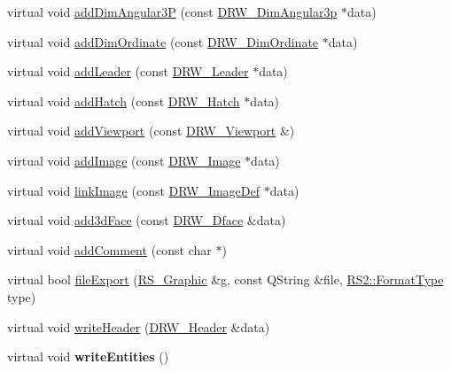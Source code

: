 \begin{DoxyCompactItemize}
virtual void \hyperlink{classRS__FilterDXFRW_af0227a89edea79079d998e4cd2887fea}{add\-Dim\-Angular3\-P} (const \hyperlink{classDRW__DimAngular3p}{D\-R\-W\-\_\-\-Dim\-Angular3p} $\ast$data)
\item 
virtual void \hyperlink{classRS__FilterDXFRW_a8db3ffff95edbce4dd2849937ed5e7ab}{add\-Dim\-Ordinate} (const \hyperlink{classDRW__DimOrdinate}{D\-R\-W\-\_\-\-Dim\-Ordinate} $\ast$data)
\item 
virtual void \hyperlink{classRS__FilterDXFRW_a0cecf17b58ada0ee9f8e30ef412c4cdd}{add\-Leader} (const \hyperlink{classDRW__Leader}{D\-R\-W\-\_\-\-Leader} $\ast$data)
\item 
virtual void \hyperlink{classRS__FilterDXFRW_ad36b05f6c1562ffaaf8a0071c7173364}{add\-Hatch} (const \hyperlink{classDRW__Hatch}{D\-R\-W\-\_\-\-Hatch} $\ast$data)
\item 
virtual void \hyperlink{classRS__FilterDXFRW_a3d98a3d45715307a82dd3f63c38d0f6d}{add\-Viewport} (const \hyperlink{classDRW__Viewport}{D\-R\-W\-\_\-\-Viewport} \&)
\item 
virtual void \hyperlink{classRS__FilterDXFRW_ad45c93da31b073e7a1726b03a8274800}{add\-Image} (const \hyperlink{classDRW__Image}{D\-R\-W\-\_\-\-Image} $\ast$data)
\item 
virtual void \hyperlink{classRS__FilterDXFRW_a69f922f17fbea3d80401a08a0b72d5bb}{link\-Image} (const \hyperlink{classDRW__ImageDef}{D\-R\-W\-\_\-\-Image\-Def} $\ast$data)
\item 
virtual void \hyperlink{classRS__FilterDXFRW_af80e98bbf60f7824e063a87ff4f1e65d}{add3d\-Face} (const \hyperlink{classDRW__3Dface}{D\-R\-W\-\_\-Dface} \&data)
\item 
virtual void \hyperlink{classRS__FilterDXFRW_a4cb3ee051fe7bf69239e12342efe0d18}{add\-Comment} (const char $\ast$)
\item 
virtual bool \hyperlink{classRS__FilterDXFRW_a45f31a6c4e858bca40ff80ef979a6518}{file\-Export} (\hyperlink{classRS__Graphic}{R\-S\-\_\-\-Graphic} \&g, const Q\-String \&file, \hyperlink{classRS2_a077a6c94c9a0ab9962c4d4a612c7189b}{R\-S2\-::\-Format\-Type} type)
\item 
virtual void \hyperlink{classRS__FilterDXFRW_afe661322997c0aafc7b7b3d60fd8f72f}{write\-Header} (\hyperlink{classDRW__Header}{D\-R\-W\-\_\-\-Header} \&data)
\item 
\hypertarget{classRS__FilterDXFRW_a502181b6d0147aef3408d5166e72a533}{virtual void {\bfseries write\-Entities} ()}\label{classRS__FilterDXFRW_a502181b6d0147aef3408d5166e72a533}


\end{DoxyCompactItemize}
